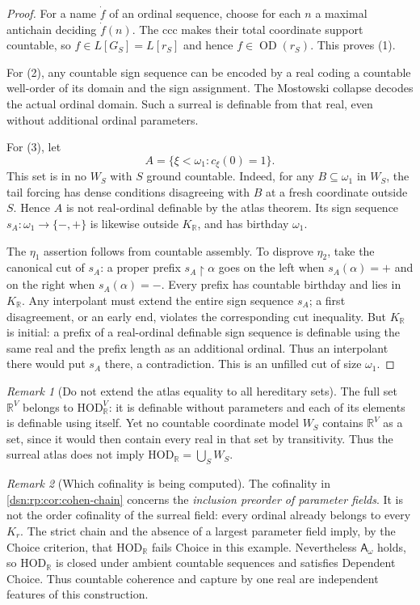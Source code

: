 \documentclass[11pt,a4paper]{article}
\numberwithin{equation}{section}
\theoremstyle{definition}
\theoremstyle{remark}
\newtheorem{remark}[remark]{Remark}
\newcommand{\HOD}{\mathrm{HOD}}
\newcommand{\R}{\mathbb R}
\newcommand{\HR}{\HOD_{\R}}
\newcommand{\KR}{K_{\R}}
\newcommand{\Asm}{\mathsf A_{\omega}}
\begin{document}
\begin{proof}
For a name $\dot f$ of an ordinal sequence, choose for each $n$ a
maximal antichain deciding $\dot f(n)$.  The ccc makes their total
coordinate support countable, so $f\in L[G_S]=L[r_S]$ and hence
$f\in\operatorname{OD}(r_S)$.  This proves (1).

For (2), any countable sign sequence can be encoded by a real coding
a countable well-order of its domain and the sign assignment.  The
Mostowski collapse decodes the actual ordinal domain.  Such a surreal
is definable from that real, even without additional ordinal parameters.

For (3), let
\[
 A=\{\xi<\omega_1:c_\xi(0)=1\}.
\]
This set is in no $W_S$ with $S$ ground countable.  Indeed, for any
$B\subseteq\omega_1$ in $W_S$, the tail forcing has dense conditions
disagreeing with $B$ at a fresh coordinate outside $S$.  Hence $A$ is
not real-ordinal definable by the atlas theorem.  Its sign sequence
$s_A:\omega_1\to\{-,+\}$ is likewise outside
$\KR$, and has birthday $\omega_1$.

The $\eta_1$ assertion follows from countable assembly.  To disprove
$\eta_2$, take the canonical cut of $s_A$: a proper prefix
$s_A\upharpoonright\alpha$ goes on the left when $s_A(\alpha)=+$
and on the right when $s_A(\alpha)=-$.  Every prefix has countable
birthday and lies in $\KR$.  Any interpolant
must extend the entire sign sequence $s_A$; a first disagreement,
or an early end, violates the corresponding cut inequality.  But
$\KR$ is initial: a prefix of a real-ordinal
definable sign sequence is definable using the same real and the
prefix length as an additional ordinal.  Thus an interpolant there
would put $s_A$ there, a contradiction.  This is an unfilled cut of
size $\omega_1$.
\end{proof}

\begin{remark}[Do not extend the atlas equality to all hereditary sets]
The full set $\mathbb R^V$ belongs to
$\HR^V$: it is definable without parameters
and each of its elements is definable using itself.  Yet no countable
coordinate model $W_S$ contains $\mathbb R^V$ as a set, since it would
then contain every real in that set by transitivity.  Thus the surreal
atlas does not imply
$\HR=\bigcup_S W_S$.
\end{remark}

\begin{remark}[Which cofinality is being computed]
The cofinality in \cref{dsn:rp:cor:cohen-chain} concerns the \emph{inclusion
preorder of parameter fields}. It is not the order cofinality of the
surreal field: every ordinal already belongs to every $K_r$.
The strict chain and the absence of a largest parameter field imply,
by the Choice criterion, that $\HR$ fails Choice in this example.
Nevertheless $\Asm$ holds, so $\HR$ is closed under ambient countable
sequences and satisfies Dependent Choice. Thus countable coherence and
capture by one real are independent features of this construction.
\end{remark}
\end{document}
